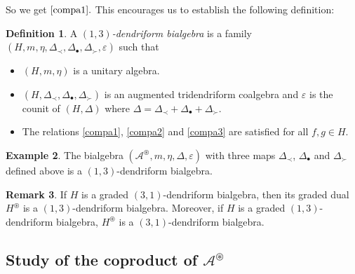 \documentclass[pdftex]{sigma}
\numberwithin{equation}{section}
\theoremstyle{definition}
\newtheorem{defi}{Definition}[section]
\newtheorem{Eg}[defi]{Example}
\newtheorem{Rq}[defi]{Remark}
\theoremstyle{plain}
\begin{document}
So we get $\eqref{compa1}.$
This encourages us to establish the following definition:
\begin{defi}
	A \emph{$(1,3)$-dendriform bialgebra} is a family $(H,m,\eta,\Delta_{\prec},\Delta_{\bullet},\Delta_{\succ},\varepsilon)$
	such that
	\begin{itemize}\itemsep=0pt
		\item $(H,m,\eta)$ is a unitary algebra.
		\item $(H,\Delta_{\prec},\Delta_{\bullet},\Delta_{\succ})$ is an augmented tridendriform coalgebra and $\varepsilon$ is the counit of $(H,\Delta)$ where $\Delta=\Delta_{\prec}+\Delta_{\bullet}+\Delta_{\succ}.$
		\item The relations \eqref{compa1}, \eqref{compa2} and \eqref{compa3} are satisfied for all $f,g\in H.$
	\end{itemize}
\end{defi}
\begin{Eg}
	The bialgebra $(\mathcal{A}^{\circledast},m,\eta,\Delta,\varepsilon)$ with three maps $\Delta_{\prec}$, $\Delta_{\bullet}$ and $\Delta_{\succ}$ defined above is a $(1,3)$-dendriform bialgebra.
\end{Eg}
\begin{Rq}
	If $H$ is a graded $(3,1)$-dendriform bialgebra, then its graded dual $H^{\circledast}$ is a $(1,3)$-dendriform bialgebra. Moreover, if $H$ is a graded $(1,3)$-dendriform bialgebra, $H^{\circledast}$ is a $(3,1)$-dendriform bialgebra.
\end{Rq}

\subsection[Study of the coproduct of A\^{}\{circledast\}]{Study of the coproduct of $\boldsymbol{\mathcal{A}^{\circledast}}$}
\end{document}
